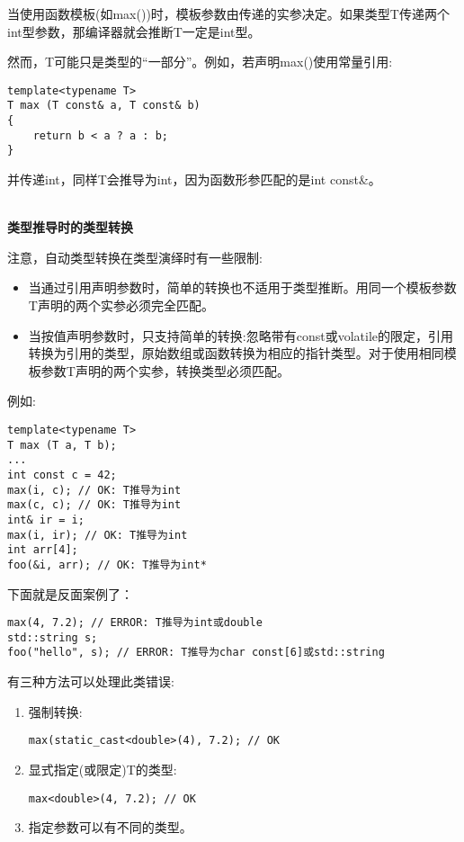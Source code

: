 当使用函数模板(如max())时，模板参数由传递的实参决定。如果类型T传递两个int型参数，那编译器就会推断T一定是int型。

然而，T可能只是类型的“一部分”。例如，若声明max()使用常量引用:

\begin{lstlisting}[style=styleCXX]
template<typename T>
T max (T const& a, T const& b)
{
	return b < a ? a : b;
}
\end{lstlisting}

并传递int，同样T会推导为int，因为函数形参匹配的是int const\&。

\hspace*{\fill} \\ %
\noindent
\textbf{类型推导时的类型转换}

注意，自动类型转换在类型演绎时有一些限制:

\begin{itemize}
\item
当通过引用声明参数时，简单的转换也不适用于类型推断。用同一个模板参数T声明的两个实参必须完全匹配。

\item
当按值声明参数时，只支持简单的转换:忽略带有const或volatile的限定，引用转换为引用的类型，原始数组或函数转换为相应的指针类型。对于使用相同模板参数T声明的两个实参，转换类型必须匹配。
\end{itemize}

例如:

\begin{lstlisting}[style=styleCXX]
template<typename T>
T max (T a, T b);
...
int const c = 42;
max(i, c); // OK: T推导为int
max(c, c); // OK: T推导为int
int& ir = i;
max(i, ir); // OK: T推导为int
int arr[4];
foo(&i, arr); // OK: T推导为int*
\end{lstlisting}

下面就是反面案例了：

\begin{lstlisting}[style=styleCXX]
max(4, 7.2); // ERROR: T推导为int或double
std::string s;
foo("hello", s); // ERROR: T推导为char const[6]或std::string
\end{lstlisting}

有三种方法可以处理此类错误:

\begin{enumerate}
\item
强制转换:
\begin{lstlisting}[style=styleCXX]
max(static_cast<double>(4), 7.2); // OK
\end{lstlisting}

\item
显式指定(或限定)T的类型:
\begin{lstlisting}[style=styleCXX]
max<double>(4, 7.2); // OK
\end{lstlisting}

\item
指定参数可以有不同的类型。
\end{enumerate}


